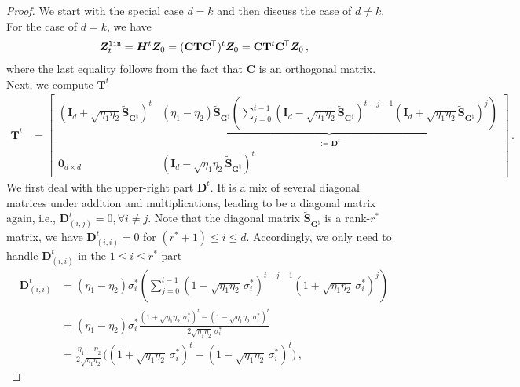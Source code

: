 \begin{proof}
    We start with the special case $d=k$ and then discuss the case of $d \neq k$.
    For the case of $d = k$, we have
    \begin{align*}
        \bm Z^{\tt lin}_t = \bm H^t \bm Z_0 = (\mathbf{C}\mathbf{T}\mathbf{C}^{\!\top})^t\bm Z_0 = \mathbf{C}\mathbf{T}^t\mathbf{C}^{\!\top}\bm Z_0\,,
    \end{align*}
    where the last equality follows from the fact that $\mathbf{C}$ is an orthogonal matrix. Next, we compute $\mathbf{T}^t$
    \begin{align}
        \mathbf{T}^t & = \begin{bmatrix}
            \left(\bm I_d + \sqrt{\eta_1 \eta_2}\widetilde{\bm S}_{\bm G^\natural}\right)^t & \underbrace{(\eta_1 - \eta_2) \widetilde{\bm S}_{\bm G^\natural}\left(\sum_{j=0}^{t-1} \left(\bm I_d - \sqrt{\eta_1 \eta_2}\widetilde{\bm S}_{\bm G^\natural}\right)^{t-j-1}\left(\bm I_d + \sqrt{\eta_1 \eta_2}\widetilde{\bm S}_{\bm G^\natural}\right)^{j}\right)}_{:= \mathbf{D}^t}\\
            \bm 0_{d\times d} & \left(\bm I_d - \sqrt{\eta_1 \eta_2}\widetilde{\bm S}_{\bm G^\natural}\right)^t
        \end{bmatrix}\label{T^t}\,.
    \end{align}
    We first deal with the upper-right part $\mathbf{D}^t$.
    It is a mix of several diagonal matrices under addition and multiplications, leading to be a diagonal matrix again, i.e., $\mathbf{D}^t_{(i,j)}=0, \forall i \neq j$. 
   Note that the diagonal matrix $\widetilde{\bm S}_{\bm G^\natural}$ is a rank-$r^*$ matrix, we have
   $\mathbf{D}^t_{(i,i)}=0$ for $(r^*+1)\leq i \leq d$. Accordingly, we only need to handle $\mathbf{D}^t_{(i,i)}$ in the $1\leq i \leq r^*$ part
    \begin{align*}
        \mathbf{D}^t_{(i,i)} & = (\eta_1 - \eta_2) \sigma_i^* \left(\sum_{j=0}^{t-1} \left(1 - \sqrt{\eta_1 \eta_2}\,\sigma_i^*\right)^{t-j-1}\left(1 + \sqrt{\eta_1 \eta_2}\,\sigma_i^*\right)^{j}\right)\\
        & = (\eta_1 - \eta_2) \sigma_i^* \frac{\left(1 + \sqrt{\eta_1 \eta_2}\,\sigma_i^*\right)^t - \left(1 - \sqrt{\eta_1 \eta_2}\,\sigma_i^*\right)^t}{ 2\sqrt{\eta_1 \eta_2}\,\sigma_i^*}\\
        & = \frac{\eta_1 - \eta_2}{2\sqrt{\eta_1 \eta_2}}\Bigg(\left(1 + \sqrt{\eta_1 \eta_2}\,\sigma_i^*\right)^t - \left(1 - \sqrt{\eta_1 \eta_2}\,\sigma_i^*\right)^t\Bigg)\,,
    \end{align*}

\end{proof}
